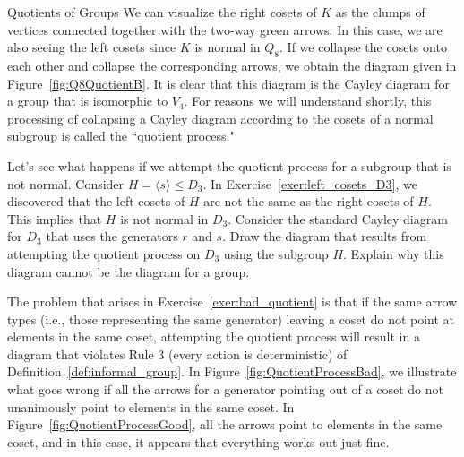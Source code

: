 \begin{section}{Quotients of Groups}
We can visualize the right cosets of $K$ as the clumps of vertices connected together with the two-way green arrows.  In this case, we are also seeing the left cosets since $K$ is normal in $Q_8$.  If we collapse the cosets onto each other and collapse the corresponding arrows, we obtain the diagram given in Figure~\ref{fig:Q8QuotientB}. It is clear that this diagram is the Cayley diagram for a group that is isomorphic to $V_4$.  For reasons we will understand shortly, this processing of collapsing a Cayley diagram according to the cosets of a normal subgroup is called the ``quotient process."

\begin{exercise}\label{exer:bad_quotient}
Let's see what happens if we attempt the quotient process for a subgroup that is not normal.  Consider $H=\langle s\rangle \leq D_3$.  In Exercise~\ref{exer:left_cosets_D3}, we discovered that the left cosets of $H$ are not the same as the right cosets of $H$.  This implies that $H$ is not normal in $D_3$.  Consider the standard Cayley diagram for $D_3$ that uses the generators $r$ and $s$.  Draw the diagram that results from attempting the quotient process on $D_3$ using the subgroup $H$.  Explain why this diagram cannot be the diagram for a group.
\end{exercise}

The problem that arises in Exercise~\ref{exer:bad_quotient} is that if the same arrow types (i.e., those representing the same generator) leaving a coset do not point at elements in the same coset, attempting the quotient process will result in a diagram that violates Rule 3 (every action is deterministic) of Definition~\ref{def:informal_group}.  In Figure~\ref{fig:QuotientProcessBad}, we illustrate what goes wrong if all the arrows for a generator pointing out of a coset do not unanimously point to elements in the same coset.  In Figure~\ref{fig:QuotientProcessGood}, all the arrows point to elements in the same coset, and in this case, it appears that everything works out just fine.


\end{section}
